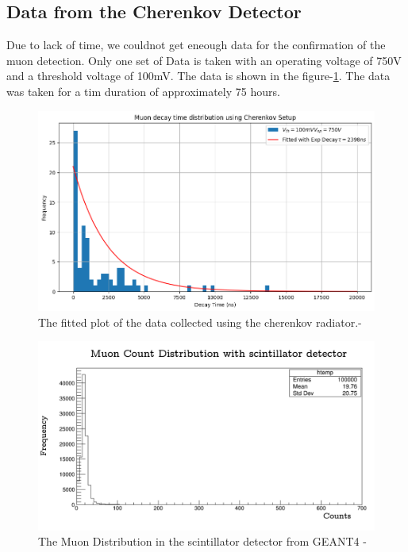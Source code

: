 \documentclass{article}
\begin{document}
\begin{multicols}{2}
\subsection{Data from the Cherenkov Detector}

Due to lack of time, we couldnot get eneough data for the confirmation of the muon detection. Only one set of Data is taken with an operating voltage of 750V and a threshold voltage of 100mV. The data is shown in the figure-\ref{cherenkovplot}. The data was taken for a tim duration of approximately 75 hours. 
\begin{figure}[H]
    \centering
    \includegraphics[width = \columnwidth]{Images/cher_plots.png}
    \caption{The fitted plot of the data collected using the cherenkov radiator.-\cite{python}}
    \label{cherenkovplot}
\end{figure}




\begin{figure}[H]
    \centering
    \includegraphics[width = \columnwidth]{Images/scint_muon_dist.png}
    \caption{The Muon Distribution in the scintillator detector from GEANT4 -\cite{agostinelli2003geant4}}
    \label{sim_scint_plot}
\end{figure}



\end{multicols}
\end{document}
